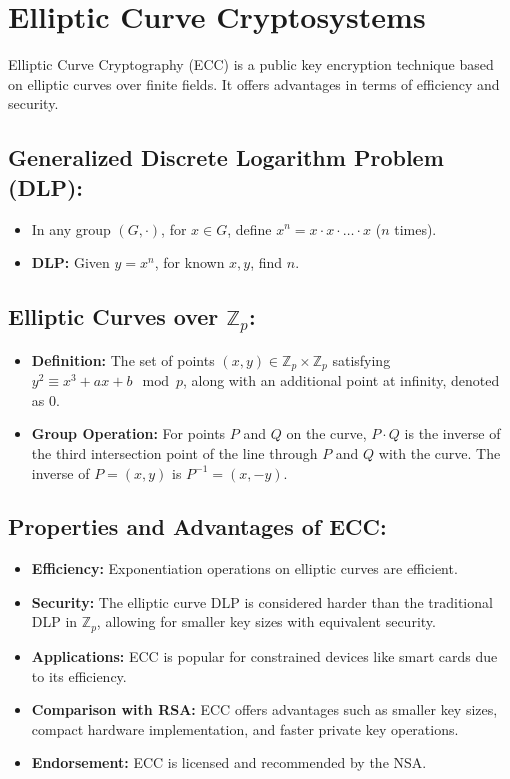 \documentclass[12pt]{article}
\begin{document}
\section*{Elliptic Curve Cryptosystems}

Elliptic Curve Cryptography (ECC) is a public key encryption technique based on elliptic curves over finite fields. It offers advantages in terms of efficiency and security.

\subsection*{Generalized Discrete Logarithm Problem (DLP):}
\begin{itemize}
    \item In any group \( (G, \cdot) \), for \( x \in G \), define \( x^n = x \cdot x \cdot \ldots \cdot x \) (\( n \) times).
    \item \textbf{DLP:} Given \( y = x^n \), for known \( x, y \), find \( n \).
\end{itemize}

\subsection*{Elliptic Curves over \( \mathbb{Z}_p \):}
\begin{itemize}
    \item \textbf{Definition:} The set of points \( (x, y) \in \mathbb{Z}_p \times \mathbb{Z}_p \) satisfying \( y^2 \equiv x^3 + ax + b \mod p \), along with an additional point at infinity, denoted as 0.
    \item \textbf{Group Operation:} For points \( P \) and \( Q \) on the curve, \( P \cdot Q \) is the inverse of the third intersection point of the line through \( P \) and \( Q \) with the curve. The inverse of \( P = (x, y) \) is \( P^{-1} = (x, -y) \).
\end{itemize}

\subsection*{Properties and Advantages of ECC:}
\begin{itemize}
    \item \textbf{Efficiency:} Exponentiation operations on elliptic curves are efficient.
    \item \textbf{Security:} The elliptic curve DLP is considered harder than the traditional DLP in \( \mathbb{Z}_p \), allowing for smaller key sizes with equivalent security.
    \item \textbf{Applications:} ECC is popular for constrained devices like smart cards due to its efficiency.
    \item \textbf{Comparison with RSA:} ECC offers advantages such as smaller key sizes, compact hardware implementation, and faster private key operations.
    \item \textbf{Endorsement:} ECC is licensed and recommended by the NSA.
\end{itemize}
\end{document}
